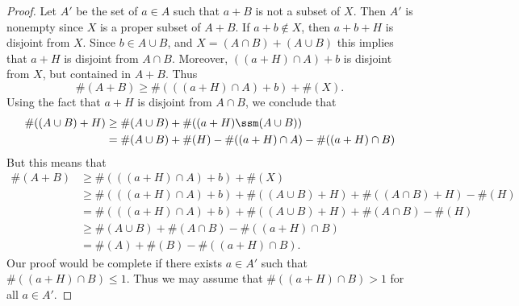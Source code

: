 \begin{proof}
    Let $A'$ be the set of $a \in A$ such that $a + B$ is not a subset of $X$. Then $A'$ is nonempty since $X$ is a proper subset of $A + B$. If $a + b \not \in X$, then $a + b + H$ is disjoint from $X$. Since $b \in A \cup B$, and $X = (A \cap B) + (A \cup B)$ this implies that $a + H$ is disjoint from $A \cap B$. Moreover, $((a + H) \cap A) + b$ is disjoint from $X$, but contained in $A + B$. Thus
    \[ \#(A + B) \geq \#(((a + H) \cap A) + b) + \#(X). \]
    Using the fact that $a + H$ is disjoint from $A \cap B$, we conclude that
    \begin{align*}
        \#((A \cup B) + H) &\geq \#(A \cup B) + \#((a + H) \ssm (A \cup B))\\
        &= \#(A \cup B) + \#(H) - \#((a + H) \cap A) - \#((a + H) \cap B)
    \end{align*}
    But this means that
    \begin{align*}
        \#(A + B) &\geq \#(((a + H) \cap A) + b) + \#(X)\\
        &\geq \#(((a + H) \cap A) + b) + \#((A \cup B) + H) + \#((A \cap B) + H) - \#(H)\\
        &= \#(((a + H) \cap A) + b) + \#((A \cup B) + H) + \#(A \cap B) - \#(H)\\
        &\geq \#(A \cup B) + \#(A \cap B) - \#((a + H) \cap B)\\
        &= \#(A) + \#(B) - \#((a + H) \cap B).
    \end{align*}
    Our proof would be complete if there exists $a \in A'$ such that $\#((a + H) \cap B) \leq 1$. Thus we may assume that $\#((a + H) \cap B) > 1$ for all $a \in A'$.


\end{proof}

